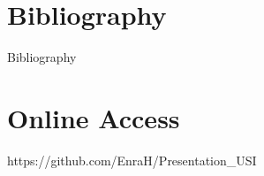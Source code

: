 \documentclass[compress,notes=hide]{beamer}
\begin{document}
\section*{Bibliography}

\begin{frame}[allowframebreaks]{Bibliography}




\end{frame}

\section{Online Access}
\begin{frame}
  https://github.com/EnraH/Presentation\_USI
\end{frame}
\end{document}

